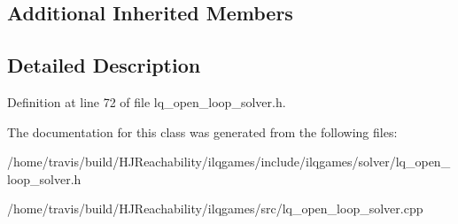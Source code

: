 \subsection*{Additional Inherited Members}


\subsection{Detailed Description}


Definition at line 72 of file lq\+\_\+open\+\_\+loop\+\_\+solver.\+h.



The documentation for this class was generated from the following files\+:\begin{DoxyCompactItemize}
\item 
/home/travis/build/\+H\+J\+Reachability/ilqgames/include/ilqgames/solver/lq\+\_\+open\+\_\+loop\+\_\+solver.\+h\item 
/home/travis/build/\+H\+J\+Reachability/ilqgames/src/lq\+\_\+open\+\_\+loop\+\_\+solver.\+cpp\end{DoxyCompactItemize}
